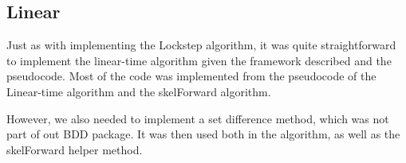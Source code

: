 \documentclass[../master/master.tex]{subfiles}
\begin{document}
\subsection{Linear}
Just as with implementing the Lockstep algorithm, it was quite straightforward to implement the linear-time algorithm given the framework described and the pseudocode. Most of the code was implemented from the pseudocode of the Linear-time algorithm and the skelForward algorithm.

However, we also needed to implement a set difference method, which was not part of out BDD package. It was then used both in the algorithm, as well as the skelForward helper method. 
\end{document}
